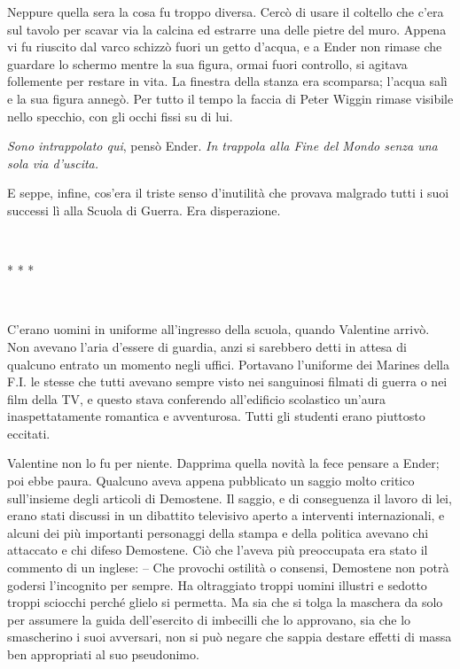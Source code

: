 {Neppure quella sera la cosa fu troppo diversa. Cercò di usare il
	coltello che c'era sul tavolo per scavar via la calcina ed estrarre una
	delle pietre del muro. Appena vi fu riuscito dal varco schizzò fuori un
	getto d'acqua, e a Ender non rimase che guardare lo schermo mentre la
	sua figura, ormai fuori controllo, si agitava follemente per restare in
	vita. La finestra della stanza era scomparsa; l'acqua salì e la sua
	figura annegò. Per tutto il tempo la faccia di Peter Wiggin rimase
	visibile nello specchio, con gli occhi fissi su di lui.}

\emph{{Sono intrappolato qui}}{, \emph{} pensò Ender. \emph{In trappola
		alla Fine del Mondo senza una sola via d'uscita.}}

{E seppe, infine, cos'era il triste senso d'inutilità che provava
	malgrado tutti i suoi successi lì alla Scuola di Guerra. Era
	disperazione.}

{~}

\begin{center}
	{* * *}
\end{center}

{~}

{C'erano uomini in uniforme all'ingresso della scuola, quando Valentine
	arrivò. Non avevano l'aria d'essere di guardia, anzi si sarebbero detti
	in attesa di qualcuno entrato un momento negli uffici. Portavano
	l'uniforme dei Marines della F.I. le stesse che tutti avevano sempre
	visto nei sanguinosi filmati di guerra o nei film della TV, e questo
	stava conferendo all'edificio scolastico un'aura inaspettatamente
	romantica e avventurosa. Tutti gli studenti erano piuttosto eccitati.}

{Valentine non lo fu per niente. Dapprima quella novità la fece pensare
	a Ender; poi ebbe paura. Qualcuno aveva appena pubblicato un saggio
	molto critico sull'insieme degli articoli di Demostene. Il saggio, e di
	conseguenza il lavoro di lei, erano stati discussi in un dibattito
	televisivo aperto a interventi internazionali, e alcuni dei più
	importanti personaggi della stampa e della politica avevano chi
	attaccato e chi difeso Demostene. Ciò che l'aveva più preoccupata era
	stato il commento di un inglese: -- Che provochi ostilità o consensi,
	Demostene non potrà godersi l'incognito per sempre. Ha oltraggiato
	troppi uomini illustri e sedotto troppi sciocchi perché glielo si
	permetta. Ma sia che si tolga la maschera da solo per assumere la guida
	dell'esercito di imbecilli che lo approvano, sia che lo smascherino i
	suoi avversari, non si può negare che sappia destare effetti di massa
	ben appropriati al suo pseudonimo.}

